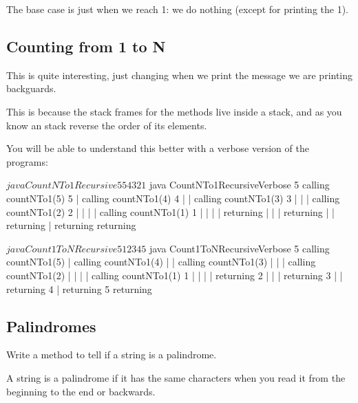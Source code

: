 \documentclass[a4paper, 9pt]{extarticle}
\begin{document}
The base case is just when we reach 1: we do nothing (except for printing the 1).

\subsection{Counting from 1 to N}

\begin{multicols}{2}
\columnbreak
\end{multicols}

This is quite interesting, just changing when we print the message we are
printing backguards.

This is because the stack frames for the methods live inside a stack, and as
you know an stack reverse the order of its elements.

You will be able to understand this better with a verbose version of the programs:

\newpage

\begin{multicols}{2}
  \begin{blackboard}
$ java CountNTo1Recursive 5
5
4
3
2
1
$ java CountNTo1RecursiveVerbose 5
calling countNTo1(5)
5
|  calling countNTo1(4)
4
|  |  calling countNTo1(3)
3
|  |  |  calling countNTo1(2)
2
|  |  |  |  calling countNTo1(1)
1
|  |  |  |  returning
|  |  |  returning
|  |  returning
|  returning
returning
\end{blackboard}
\columnbreak
  \begin{blackboard}
$ java Count1ToNRecursive 5
1
2
3
4
5
$ java Count1ToNRecursiveVerbose 5
calling countNTo1(5)
|  calling countNTo1(4)
|  |  calling countNTo1(3)
|  |  |  calling countNTo1(2)
|  |  |  |  calling countNTo1(1)
1
|  |  |  |  returning
2
|  |  |  returning
3
|  |  returning
4
|  returning
5
returning
\end{blackboard}
\end{multicols}



\subsection{Palindromes}

Write a method to tell if a string is a palindrome.

A string is a palindrome if it has the same characters when you read it from
the beginning to the end or backwards.
\end{document}
